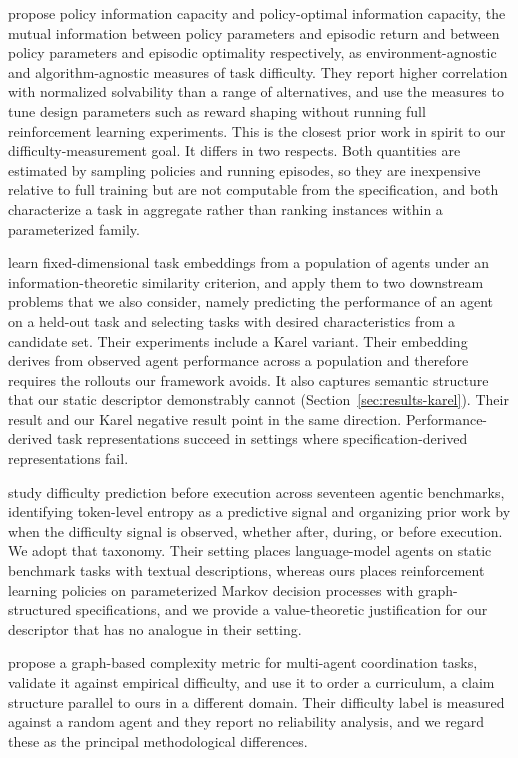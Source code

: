 \documentclass[twoside]{article}
\begin{document}
\citet{furuta2021policy} propose policy information capacity and policy-optimal information capacity, the mutual information between policy parameters and episodic return and between policy parameters and episodic optimality respectively, as environment-agnostic and algorithm-agnostic measures of task difficulty. They report higher correlation with normalized solvability than a range of alternatives, and use the measures to tune design parameters such as reward shaping without running full reinforcement learning experiments. This is the closest prior work in spirit to our difficulty-measurement goal. It differs in two respects. Both quantities are estimated by sampling policies and running episodes, so they are inexpensive relative to full training but are not computable from the specification, and both characterize a task in aggregate rather than ranking instances within a parameterized family.

\citet{mahajan2024learning} learn fixed-dimensional task embeddings from a population of agents under an information-theoretic similarity criterion, and apply them to two downstream problems that we also consider, namely predicting the performance of an agent on a held-out task and selecting tasks with desired characteristics from a candidate set. Their experiments include a Karel variant. Their embedding derives from observed agent performance across a population and therefore requires the rollouts our framework avoids. It also captures semantic structure that our static descriptor demonstrably cannot (Section~\ref{sec:results-karel}). Their result and our Karel negative result point in the same direction. Performance-derived task representations succeed in settings where specification-derived representations fail.

\citet{krsteski2026predicting} study difficulty prediction before execution across seventeen agentic benchmarks, identifying token-level entropy as a predictive signal and organizing prior work by when the difficulty signal is observed, whether after, during, or before execution. We adopt that taxonomy. Their setting places language-model agents on static benchmark tasks with textual descriptions, whereas ours places reinforcement learning policies on parameterized Markov decision processes with graph-structured specifications, and we provide a value-theoretic justification for our descriptor that has no analogue in their setting.

\citet{arxiv2507graph} propose a graph-based complexity metric for multi-agent coordination tasks, validate it against empirical difficulty, and use it to order a curriculum, a claim structure parallel to ours in a different domain. Their difficulty label is measured against a random agent and they report no reliability analysis, and we regard these as the principal methodological differences.
\end{document}
